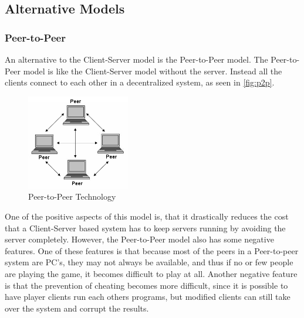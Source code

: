 \subsection{Alternative Models}
\subsubsection{Peer-to-Peer}
An alternative to the Client-Server model is the Peer-to-Peer model.
The Peer-to-Peer model is like the Client-Server model without the server.
Instead all the clients connect to each other in a decentralized system, as seen in \autoref{fig:p2p}.

\begin{figure}[ht]
  \centering
    \includegraphics[width=0.4\textwidth]{img/p2p.jpg}
  \caption{Peer-to-Peer Technology \citep{PeerToPeer}}
  \label{fig:p2p}
\end{figure}

One of the positive aspects of this model is, that it drastically reduces the cost that a Client-Server based system has to keep servers running by avoiding the server completely.
However, the Peer-to-Peer model also has some negative features.
One of these features is that because most of the peers in a Peer-to-peer system are PC's, they may not always be available, and thus if no or few people are playing the game, it becomes difficult to play at all.
Another negative feature is that the prevention of cheating becomes more difficult, since it is possible to have player clients run each others programs, but modified clients can still take over the system and corrupt the results.\newline